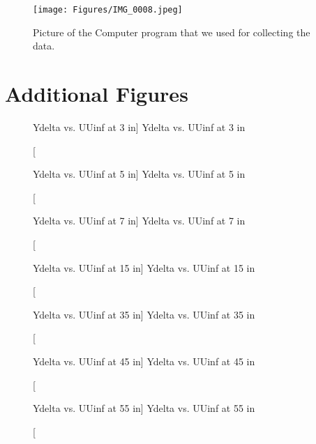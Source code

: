 \begin{figure}[htpb]
    \centering
    \texttt{[image: Figures/IMG\_0008.jpeg]}
    \caption[Picture of the Computer program that we used for collecting the data.]{Picture of the Computer program that we used for collecting the data.}
    \label{fig: DataCollectionTool}
\end{figure}

\newpage

\section{Additional Figures} \label{sec:additional_figures}

\begin{figure}[htpb]
    \centering
     
     \caption
     [Ydelta vs. UUinf at 3 in]
     {Ydelta vs. UUinf at 3 in}
     \label{fig:YdelvsUUinfat3in}
\end{figure}

\begin{figure}[htpb]
    \centering
     
     \caption
     [Ydelta vs. UUinf at 5 in]
     {Ydelta vs. UUinf at 5 in}
     \label{fig:YdelvsUUinfat5in}
\end{figure}

\begin{figure}[htpb]
    \centering
     
     \caption
     [Ydelta vs. UUinf at 7 in]
     {Ydelta vs. UUinf at 7 in}
     \label{fig:YdelvsUUinfat7in}
\end{figure}

\begin{figure}[htpb]
    \centering
     
     \caption
     [Ydelta vs. UUinf at 15 in]
     {Ydelta vs. UUinf at 15 in}
     \label{fig:YdelvsUUinfat15in}
\end{figure}

\begin{figure}[htpb]
    \centering
     
     \caption
     [Ydelta vs. UUinf at 35 in]
     {Ydelta vs. UUinf at 35 in}
     \label{fig:YdelvsUUinfat35in}
\end{figure}

\begin{figure}[htpb]
    \centering
     
     \caption
     [Ydelta vs. UUinf at 45 in]
     {Ydelta vs. UUinf at 45 in}
     \label{fig:YdelvsUUinfat45in}
\end{figure}

\begin{figure}[htpb]
    \centering
     
     \caption
     [Ydelta vs. UUinf at 55 in]
     {Ydelta vs. UUinf at 55 in}
     \label{fig:YdelvsUUinfat55in}
\end{figure}








